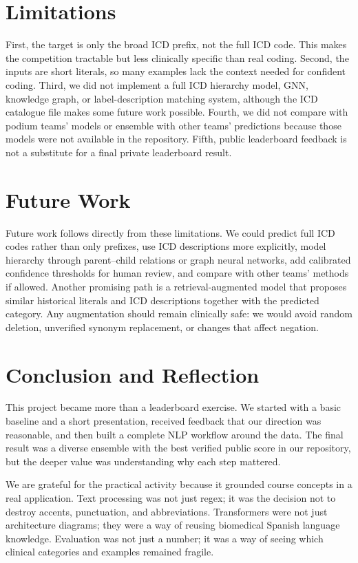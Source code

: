 \documentclass[10pt,a4paper,twocolumn]{article}
\begin{document}
\section{Limitations}

First, the target is only the broad ICD prefix, not the full ICD code. This makes the competition tractable but less clinically specific than real coding. Second, the inputs are short literals, so many examples lack the context needed for confident coding. Third, we did not implement a full ICD hierarchy model, GNN, knowledge graph, or label-description matching system, although the ICD catalogue file makes some future work possible. Fourth, we did not compare with podium teams' models or ensemble with other teams' predictions because those models were not available in the repository. Fifth, public leaderboard feedback is not a substitute for a final private leaderboard result.

\section{Future Work}

Future work follows directly from these limitations. We could predict full ICD codes rather than only prefixes, use ICD descriptions more explicitly, model hierarchy through parent--child relations or graph neural networks, add calibrated confidence thresholds for human review, and compare with other teams' methods if allowed. Another promising path is a retrieval-augmented model that proposes similar historical literals and ICD descriptions together with the predicted category. Any augmentation should remain clinically safe: we would avoid random deletion, unverified synonym replacement, or changes that affect negation.

\section{Conclusion and Reflection}

This project became more than a leaderboard exercise. We started with a basic baseline and a short presentation, received feedback that our direction was reasonable, and then built a complete NLP workflow around the data. The final result was a diverse ensemble with the best verified public score in our repository, but the deeper value was understanding why each step mattered.

We are grateful for the practical activity because it grounded course concepts in a real application. Text processing was not just regex; it was the decision not to destroy accents, punctuation, and abbreviations. Transformers were not just architecture diagrams; they were a way of reusing biomedical Spanish language knowledge. Evaluation was not just a number; it was a way of seeing which clinical categories and examples remained fragile.
\end{document}
